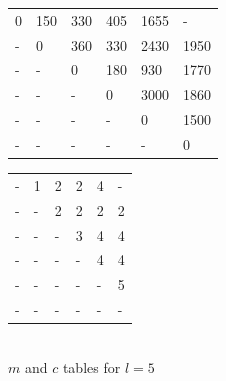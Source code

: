 \documentclass[11pt]{article}
\begin{document}
\begin{sol}
{%
	\centering
	\begin{tabular}{|l|l|l|l|l|l|}
		 \hline
        0 & 150 & 330 & 405 & 1655 & - \\ 
        - & 0 & 360 &330 & 2430 & 1950 \\ 
        - & - & 0 & 180 & 930 & 1770 \\ 
        - & - & - & 0 & 3000 & 1860\\ 
        - & - & - & - & 0 & 1500  \\ 
        - & - & - & - & - & 0 \\
        \hline
	\end{tabular}
	\hspace{20mm}
	\begin{tabular}{|l|l|l|l|l|l|}
		 \hline
        - & 1 & 2 & 2 & 4 & - \\ 
        - & - & 2 & 2 & 2 & 2 \\ 
        - & - & - & 3 & 4 & 4 \\ 
        - & - & - & - & 4 & 4 \\ 
        - & - & - & - & - & 5 \\ 
        - & - & - & - & - & - \\
        \hline
	\end{tabular}\\ 
\vspace{0.5cm}
$m$ and $c$ tables for $l = 5$\\ 
\vspace{0.5cm}


}
\end{sol}
\end{document}

